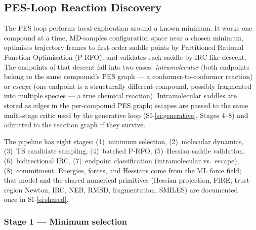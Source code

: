 %

\subsection{PES-Loop Reaction Discovery}
\label{si:pes}

The PES loop performs local exploration around a known minimum. It works one compound at a time, MD-samples configuration space near a chosen minimum, optimises trajectory frames to first-order saddle points by Partitioned Rational Function Optimisation (P-RFO), and validates each saddle by IRC-like descent. The endpoints of that descent fall into two cases: \emph{intramolecular} (both endpoints belong to the same compound's PES graph --- a conformer-to-conformer reaction) or \emph{escape} (one endpoint is a structurally different compound, possibly fragmented into multiple species --- a true chemical reaction). Intramolecular saddles are stored as edges in the per-compound PES graph; escapes are passed to the same multi-stage critic used by the generative loop (SI-\ref{si:generative}, Stages 4--8) and admitted to the reaction graph if they survive.

The pipeline has eight stages: (1)~minimum selection, (2)~molecular dynamics, (3)~TS candidate sampling, (4)~batched P-RFO, (5)~Hessian saddle validation, (6)~bidirectional IRC, (7)~endpoint classification (intramolecular vs.\ escape), (8)~commitment. Energies, forces, and Hessians come from the ML force field; that model and the shared numerical primitives (Hessian projection, FIRE, trust-region Newton, IRC, NEB, RMSD, fragmentation, SMILES) are documented once in SI-\ref{si:shared}.


\subsubsection{Stage 1 --- Minimum selection}
\label{sec:pes-select}

